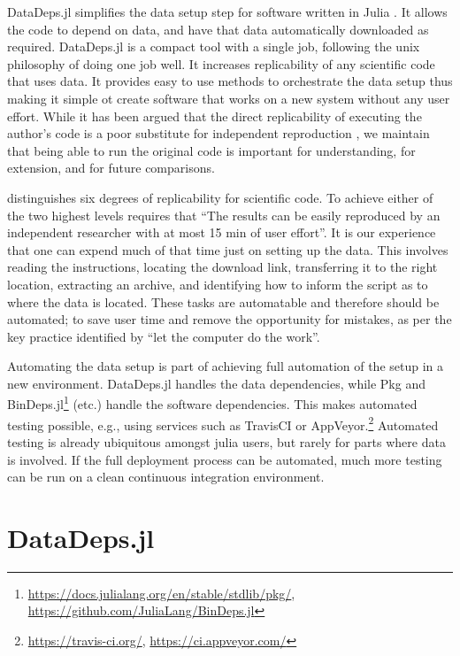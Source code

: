 \documentclass[twoside,11pt]{article}
\begin{document}
DataDeps.jl simplifies the data setup step for software written in Julia \citep{Julia}.
It allows the code to depend on data, and have that data automatically downloaded as required.
DataDeps.jl is a compact tool with a single job, following the unix philosophy of doing one job well.
It increases replicability of any scientific code that uses data.
It provides easy to use methods to orchestrate the data setup thus making it simple ot create software that works on a new system without any user effort.
While it has been argued that the direct replicability of executing the author's code is a poor substitute for independent reproduction \citet{drummond2009replicability},
we maintain that being able to run the original code is important for understanding, for extension, and for future comparisons.


\citet{VabdewakkeReproduceableResearch} distinguishes six degrees of replicability for scientific code.
To achieve either of the two highest levels
requires that ``The results can be easily reproduced by an independent researcher with at most 15 min of user effort''.
It is our experience that one can  expend much of that time just on setting up the data.
This involves reading the instructions, locating the download link, transferring it to the right location, extracting an archive, and identifying how to inform the script as to where the data is located.
These tasks are automatable and therefore should be automated; to save user time and remove the opportunity for mistakes, as per the key practice identified by \citet{10.1371/journal.pbio.1001745} ``let the computer do the work''.

Automating the data setup is part of achieving full automation of the setup in a new environment.
DataDeps.jl handles the data dependencies, while Pkg
 and BinDeps.jl\footnote{\url{https://docs.julialang.org/en/stable/stdlib/pkg/}, \url{https://github.com/JuliaLang/BinDeps.jl}}
 (etc.) handle the software dependencies.
This makes automated testing possible, e.g., using services such as 
TravisCI or AppVeyor.\footnote{\url{https://travis-ci.org/}, \url{https://ci.appveyor.com/}}
Automated testing is already ubiquitous amongst julia users, but rarely for parts where data is involved.
If the full deployment process can be automated, much more testing can be run on a clean continuous integration environment.


\section{DataDeps.jl}
\end{document}
